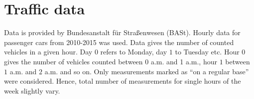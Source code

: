 \documentclass[a4paper,10pt]{article}
\begin{document}
\section{Traffic data}
Data is provided by Bundesanstalt für Straßenwesen (BASt).
Hourly data for passenger cars from 2010-2015 was used.
Data gives the number of counted vehicles in a given hour.
Day $0$ refers to Monday, day $1$ to Tuesday etc.
Hour $0$ gives the number of vehicles counted between 0 a.m. and 1 a.m., hour $1$ between $1$ a.m. and $2$ a.m. and so on.
Only measurements marked as ``on a regular base'' were considered. 
Hence, total number of measurements for single hours of the week slightly vary.
\end{document}
